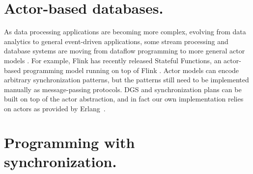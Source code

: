 \section{Actor-based databases.}
As data processing applications are becoming more complex, evolving from
data analytics to general event-driven applications, some stream
processing and database systems are moving from dataflow programming to more
general actor models
\cite{DBLP:conf/sigmod/CarboneFKK20,DBLP:conf/cidr/Bernstein19,DBLP:conf/cidr/BernsteinDKM17,DBLP:conf/sigmod/0001S18,xu2021move}.
For example, Flink has recently released Stateful Functions,
an actor-based programming model running on top of Flink
\cite{DBLP:journals/pvldb/AkhterFK19,StatefulFunctions}.
Actor models can encode arbitrary synchronization patterns,
but the patterns still need to be implemented manually as
message-passing protocols.
DGS and synchronization plans can be built on top
of the actor abstraction, and in fact our own implementation
relies on actors as provided by Erlang~\cite{armstrong1993erlang}.

\section{Programming with synchronization.}

